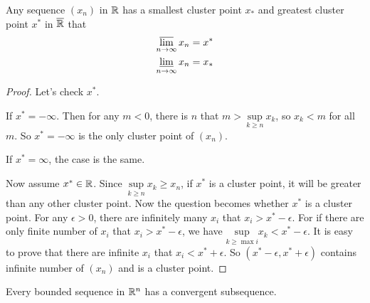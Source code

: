 \begin{theorem}
    Any sequence $(x_n)$ in $\mathbb{R}$ has a smallest cluster point $x_*$ and greatest cluster point $x^*$ in $\overline{\mathbb{R}}$ that
    \begin{equation}
        \begin{aligned}
            \varlimsup_{n\rightarrow \infty} x_n &= x^* \\
            \varliminf_{n\rightarrow \infty} x_n &= x_*
        \end{aligned}
    \end{equation}
\end{theorem}
\begin{proof}
    Let's check $x^*$. 
    
    If $x^* = - \infty$. Then for any $m < 0$, there is $n$ that $m > \underset{k \geq n}{\text{ sup }} x_k$, so $x_k < m$ for all $m$. So $x^* = -\infty$ is the only cluster point of $(x_n)$.
    
    If $x^* = \infty$, the case is the same.
        
    Now assume $x^* \in \mathbb{R}$. Since $\underset{k \geq n}{\text{ sup }} x_k \geq x_n$, if $x^*$ is a cluster point, it will be greater than any other cluster point. Now the question becomes whether $x^*$ is a cluster point. For any $\epsilon>0$, there are infinitely many $x_i$ that $x_i > x^* - \epsilon$. For if there are only finite number of $x_i$ that $x_i > x^* - \epsilon$, we have $\underset{k \geq \max i }{\text{ sup }} x_k < x^* - \epsilon$. It is easy to prove that there are infinite $x_i$ that $x_i < x^* + \epsilon$. So $(x^* - \epsilon, x^* + \epsilon)$ contains infinite number of $(x_n)$ and is a cluster point.
\end{proof}

\begin{theorem}
    Every bounded sequence in $\mathbb{R}^n$ has a convergent subsequence. 
\end{theorem}

